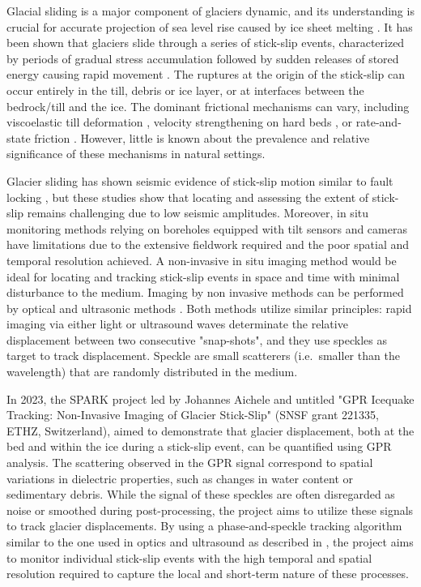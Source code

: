 Glacial sliding is a major component of glaciers dynamic, and its understanding is crucial for accurate projection of sea level rise caused by ice sheet melting \citep{Ritz&al2015}. It has been shown that glaciers slide through a series of stick-slip events, characterized by periods of gradual stress accumulation followed by sudden releases of stored energy causing rapid movement \citep{Walter&al2011,Podolskiy&al2016,Grab&al2021}. The ruptures at the origin of the stick-slip can occur entirely in the till, debris or ice layer, or at interfaces between the bedrock/till and the ice. The dominant frictional mechanisms can vary, including viscoelastic till deformation \citep{Tulaczyk&al1999}, velocity strengthening on hard beds \citep{Guerin&al2021}, or rate-and-state friction \citep{Zoet&al2020}. However, little is known about the prevalence and relative significance of these mechanisms in natural settings. 

Glacier sliding has shown seismic evidence of stick-slip motion similar to fault locking \citep{Podolskiy&al2016,Graff&Walter2021}, but these studies show that locating and assessing the extent of stick-slip remains challenging due to low seismic amplitudes. Moreover, in situ monitoring methods relying on boreholes equipped with tilt sensors and cameras have limitations due to the extensive fieldwork required and the poor spatial and temporal resolution achieved. A non-invasive in situ imaging method would be ideal for locating and tracking stick-slip events in space and time with minimal disturbance to the medium. Imaging by non invasive methods can be performed by optical \citep[e.g.][]{Rubino&al2020,Steinhardt&al2022} and ultrasonic methods \citep[e.g.][]{Latour&al2011,Aichele&al2023}. Both methods utilize similar principles: rapid imaging via either light or ultrasound waves determinate the relative displacement between two consecutive "snap-shots", and they use speckles as target to track displacement. Speckle are small scatterers (i.e.\ smaller than the wavelength) that are randomly distributed in the medium. 

In 2023, the SPARK project led by Johannes Aichele and untitled "GPR Icequake Tracking: Non-Invasive Imaging of Glacier Stick-Slip" (SNSF grant 221335, ETHZ, Switzerland), aimed to demonstrate that glacier displacement, both at the bed and within the ice during a stick-slip event, can be quantified using GPR analysis. The scattering observed in the GPR signal correspond to spatial variations in dielectric properties, such as changes in water content or sedimentary debris. While the signal of these speckles are often disregarded as noise or smoothed during post-processing, the project aims to utilize these signals to track glacier displacements. By using a phase-and-speckle tracking algorithm similar to the one used in optics and ultrasound as described in \cite{Aichele2019}, the project aims to monitor individual stick-slip events with the high temporal and spatial resolution required to capture the local and short-term nature of these processes.

